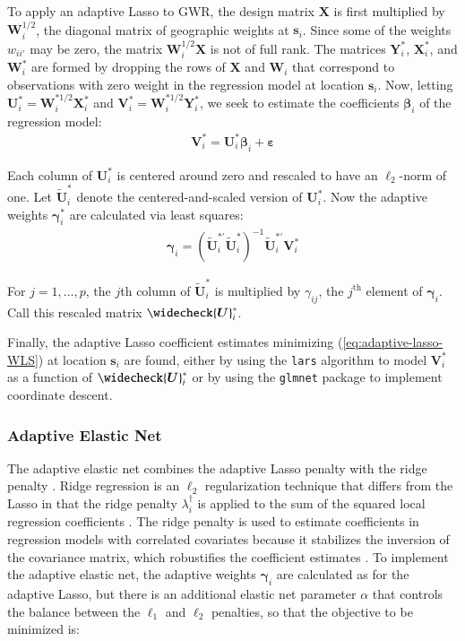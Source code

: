 \documentclass[authoryear, review, 11pt]{elsarticle}
\begin{document}
	To apply an adaptive Lasso to GWR, the design matrix $\bm{X}$ is first multiplied by $\bm{W}_i^{1/2}$, the diagonal matrix of geographic weights at $\bm{s}_i$. Since some of the weights $w_{ii'}$ may be zero, the matrix $\bm{W}_i^{1/2}\bm{X}$ is not of full rank. The matrices $\bm{Y}_i^*$, $\bm{X}_i^*$, and $\bm{W}_i^*$ are formed by dropping the rows of $\bm{X}$  and $\bm{W}_i$ that correspond to observations with zero weight in the regression model at location $\bm{s}_i$. Now, letting $\bm{U}_i^* = \bm{W}_i^{*1/2} \bm{X}_i^*$ and $\bm{V}_i^* = \bm{W}_i^{*1/2} \bm{Y}_i^*$, we seek to estimate the coefficients $\bm{\beta}_i$ of the regression model:	
	\begin{align}
		\bm{V}_i^* = \bm{U}_i^* \bm{\beta}_i + \bm{\varepsilon}
	\end{align}
	
	Each column of $\bm{U}_i^*$ is centered around zero and rescaled to have an $\ell_2$-norm of one. Let $\widetilde{\bm{U}}_i^*$ denote the centered-and-scaled version of $\bm{U}_i^*$. Now the adaptive weights $\bm{\gamma}_i^*$ are calculated via least squares:	
	\begin{align}\label{eq:adaptive-weights-regression}
		\bm{\gamma}_i = \left( \widetilde{\bm{U}}_i^{*'} \widetilde{\bm{U}}_i^* \right)^{-1} \widetilde{\bm{U}}_i^{*'} \bm{V}_i^*
	\end{align}
	
	For $j=1, \dots, p$, the $j$th column of $\tilde{\bm{U}}_i^*$ is multiplied by $\gamma_{ij}$, the $j^\text{th}$ element of $\bm{\gamma}_i$. Call this rescaled matrix $\widecheck{\bm{U}}_i^*$.
	
	Finally, the adaptive Lasso coefficient estimates minimizing (\ref{eq:adaptive-lasso-WLS}) at location $\bm{s}_i$ are found, either by using the \verb!lars! algorithm \citep{Efron:2004b} to model $\bm{V}_i^*$ as a function of $\widecheck{\bm{U}}_i^*$ or by using the \verb!glmnet! package to implement coordinate descent.


	\subsubsection{Adaptive Elastic Net}
	The adaptive elastic net combines the adaptive Lasso penalty with the ridge penalty \citep{Zou:2009}. Ridge regression is an $\ell_2$ regularization technique that differs from the Lasso in that the ridge penalty $\lambda^{\dagger}_i$ is applied to the sum of the squared local regression coefficients \citep{Hoerl:1970}. The ridge penalty is used to estimate coefficients in regression models with correlated covariates because it stabilizes the inversion of the covariance matrix, which robustifies the coefficient estimates \citep{Hastie:2009}. To implement the adaptive elastic net, the adaptive weights $\bm{\gamma}_i$ are calculated as for the adaptive Lasso, but there is an additional elastic net parameter $\alpha$ that controls the balance between the $\ell_1$ and $\ell_2$ penalties, so that the objective to be minimized is:
\end{document}
